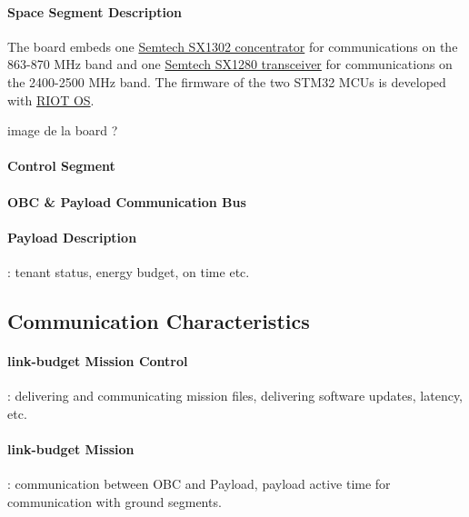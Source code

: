 \paragraph*{Space Segment Description}



The board embeds one \href{https://www.semtech.com/products/wireless-rf/lora-gateways/sx1302}{Semtech SX1302 concentrator} for communications on the 863-870 MHz 
band and one \href{https://www.semtech.com/products/wireless-rf/24-ghz-transceivers/sx1280}{Semtech SX1280 transceiver} for communications on the 2400-2500 MHz band. 
The firmware of the two STM32 MCUs is developed with \href{https://github.com/RIOT-OS/RIOT}{RIOT OS}.

image de la board ?

\paragraph*{Control Segment} %
\paragraph*{OBC \& Payload Communication Bus}
\paragraph*{Payload Description}: tenant status, energy budget, on time etc.

\subsection{Communication Characteristics}
\paragraph*{link-budget Mission Control}: delivering and communicating mission
files, delivering software updates, latency, etc.
\paragraph*{link-budget Mission}: communication between OBC and Payload, payload
active time for communication with ground segments.

